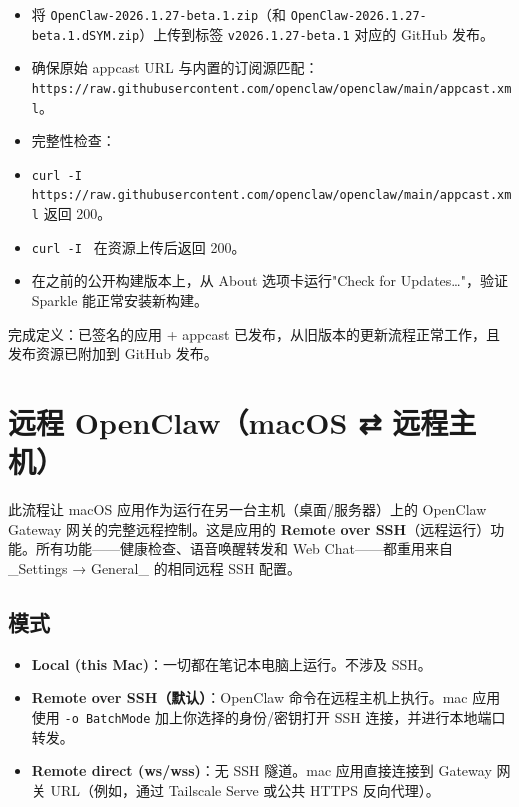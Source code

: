 \begin{itemize}
  \item 将 \texttt{OpenClaw-2026.1.27-beta.1.zip}（和 \texttt{OpenClaw-2026.1.27-beta.1.dSYM.zip}）上传到标签 \texttt{v2026.1.27-beta.1} 对应的 GitHub 发布。
  \item 确保原始 appcast URL 与内置的订阅源匹配：\texttt{https://raw.githubusercontent.com/openclaw/openclaw/main/appcast.xml}。
  \item 完整性检查：
  \item \texttt{curl -I https://raw.githubusercontent.com/openclaw/openclaw/main/appcast.xml} 返回 200。
  \item \texttt{curl -I } 在资源上传后返回 200。
  \item 在之前的公开构建版本上，从 About 选项卡运行"Check for Updates…"，验证 Sparkle 能正常安装新构建。
\end{itemize}


完成定义：已签名的应用 + appcast 已发布，从旧版本的更新流程正常工作，且发布资源已附加到 GitHub 发布。


\clearpage

\section{远程 OpenClaw（macOS ⇄ 远程主机）}


此流程让 macOS 应用作为运行在另一台主机（桌面/服务器）上的 OpenClaw Gateway 网关的完整远程控制。这是应用的 \textbf{Remote over SSH}（远程运行）功能。所有功能——健康检查、语音唤醒转发和 Web Chat——都重用来自 \_Settings → General\_ 的相同远程 SSH 配置。

\subsection{模式}


\begin{itemize}
  \item \textbf{Local (this Mac)}：一切都在笔记本电脑上运行。不涉及 SSH。
  \item \textbf{Remote over SSH（默认）}：OpenClaw 命令在远程主机上执行。mac 应用使用 \texttt{-o BatchMode} 加上你选择的身份/密钥打开 SSH 连接，并进行本地端口转发。
  \item \textbf{Remote direct (ws/wss)}：无 SSH 隧道。mac 应用直接连接到 Gateway 网关 URL（例如，通过 Tailscale Serve 或公共 HTTPS 反向代理）。
\end{itemize}


